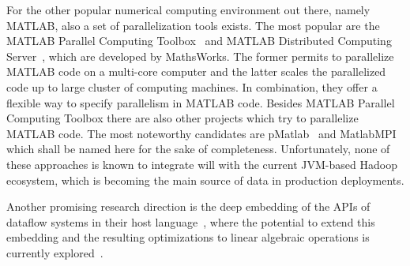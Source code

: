 For the other popular numerical computing environment out there, namely MATLAB, also a set of parallelization tools exists. The most popular are the MATLAB Parallel Computing Toolbox~\cite{parallelComputingToolbox} and MATLAB Distributed Computing Server~\cite{distributedComputingServer}, which are developed by MathsWorks. The former permits to parallelize MATLAB code on a multi-core computer and the latter scales the parallelized code up to large cluster of computing machines. In combination, they offer a flexible way to specify parallelism in MATLAB code. Besides MATLAB Parallel Computing Toolbox there are also other projects which try to parallelize MATLAB code. The most noteworthy candidates are pMatlab~\cite{bliss:ijhpca2007a} and MatlabMPI~\cite{kepner:jpdc2004a} which shall be named here for the sake of completeness. Unfortunately, none of these approaches is known to integrate will with the current JVM-based Hadoop ecosystem, which is becoming the main source of data in production deployments.

Another promising research direction is the deep embedding of the APIs of dataflow systems in their host language~\cite{Alexandrov2015}, where the potential to extend this embedding and the resulting optimizations to linear algebraic operations is currently explored~\cite{Kunft2016}.